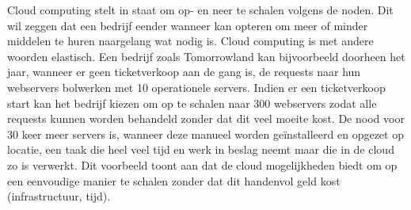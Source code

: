 \begin{description}[style=unboxed, labelwidth=\linewidth, listparindent =0pt]
    \item [Schaalbaarheid en flexibiliteit]
    Cloud computing stelt in staat om op- en neer te schalen volgens de noden. Dit wil zeggen dat een bedrijf eender wanneer kan opteren om meer of minder middelen te huren naargelang wat nodig is. Cloud computing is met andere woorden elastisch. Een bedrijf zoals Tomorrowland kan bijvoorbeeld doorheen het jaar, wanneer er geen ticketverkoop aan de gang is, de requests naar hun webservers bolwerken met 10 operationele servers. Indien er een ticketverkoop start kan het bedrijf kiezen om op te schalen naar 300 webservers zodat alle requests kunnen worden behandeld zonder dat dit veel moeite kost. De nood voor 30 keer meer servers is, wanneer deze manueel worden geïnstalleerd en opgezet op locatie, een taak die heel veel tijd en werk in beslag neemt maar die in de cloud zo is verwerkt. Dit voorbeeld toont aan dat de cloud mogelijkheden biedt om op een eenvoudige manier te schalen zonder dat dit handenvol geld kost (infrastructuur, tijd).
    \\ 
\end{description}

